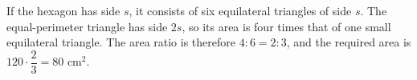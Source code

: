 If the hexagon has side $s$, it consists of six equilateral triangles of side $s$. The equal-perimeter triangle has side $2s$, so its area is four times that of one small equilateral triangle. The area ratio is therefore $4:6=2:3$, and the required area is $120\cdot\dfrac{2}{3}=\boxed{80\text{ cm}^2}$.

